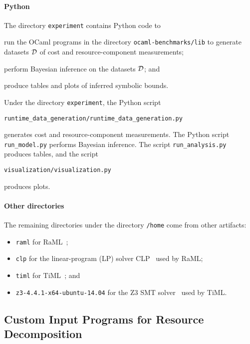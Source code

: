 \paragraph{Python}

The directory \texttt{experiment} contains Python code to
\begin{enumerate*}[label=(\roman*)]
  \item run the OCaml programs in the directory \texttt{ocaml-benchmarks/lib}
        to generate datasets $\mathcal{D}$ of cost and resource-component measurements;
  \item perform Bayesian inference on the datasets $\mathcal{D}$; and
  \item produce tables and plots of inferred symbolic bounds.
\end{enumerate*}
%
Under the directory \texttt{experiment}, the Python script
\begin{verbatim}
runtime_data_generation/runtime_data_generation.py
\end{verbatim}
generates cost and resource-component measurements.
%
The Python script \texttt{run\_model.py} performs Bayesian inference.
%
The script \texttt{run\_analysis.py} produces tables, and the script
\begin{verbatim}
visualization/visualization.py
\end{verbatim}
produces plots.

\paragraph{Other directories}

The remaining directories under the directory \texttt{/home} come from other
artifacts:
\begin{itemize}
  \item \texttt{raml} for RaML~\citep{RaML,Hoffmann2017};
  \item \texttt{clp} for the linear-program (LP) solver CLP~\citep{CLP} used by
        RaML;
  \item \texttt{timl} for TiML~\citep{WangWC17}; and
  \item \texttt{z3-4.4.1-x64-ubuntu-14.04} for the Z3 SMT
        solver~\citep{DeMoura2008} used by TiML.
\end{itemize}

\subsection{Custom Input Programs for Resource Decomposition}

